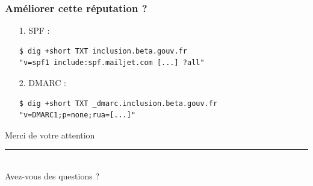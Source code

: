 \documentclass{beamer}
\begin{document}
\begin{frame}[fragile]
    \frametitle{Améliorer cette réputation ?}
    \begin{itemize}
        \pause
        \item[1.] SPF :
            \begin{verbatim}
$ dig +short TXT inclusion.beta.gouv.fr
"v=spf1 include:spf.mailjet.com [...] ?all"
            \end{verbatim}
        \pause
        \item[2.] DMARC :
            \begin{verbatim}
$ dig +short TXT _dmarc.inclusion.beta.gouv.fr
"v=DMARC1;p=none;rua=[...]"
            \end{verbatim}
    \end{itemize}
\end{frame}

\begin{frame}[focus]
    Merci de votre attention
    \\
    \vspace{20pt}
    \rule{\textwidth}{1pt}
    \\
    \vspace{30pt}
    Avez-vous des questions ?
\end{frame}
\end{document}
